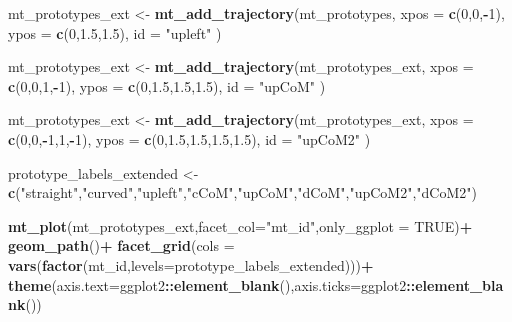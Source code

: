\documentclass[
]{article}
\newenvironment{Shaded}{\begin{snugshade}}{\end{snugshade}}
\newcommand{\AttributeTok}[1]{\textcolor[rgb]{0.13,0.29,0.53}{#1}}
\newcommand{\ConstantTok}[1]{\textcolor[rgb]{0.56,0.35,0.01}{#1}}
\newcommand{\DecValTok}[1]{\textcolor[rgb]{0.00,0.00,0.81}{#1}}
\newcommand{\FloatTok}[1]{\textcolor[rgb]{0.00,0.00,0.81}{#1}}
\newcommand{\FunctionTok}[1]{\textcolor[rgb]{0.13,0.29,0.53}{\textbf{#1}}}
\newcommand{\NormalTok}[1]{#1}
\newcommand{\OtherTok}[1]{\textcolor[rgb]{0.56,0.35,0.01}{#1}}
\newcommand{\SpecialCharTok}[1]{\textcolor[rgb]{0.81,0.36,0.00}{\textbf{#1}}}
\newcommand{\StringTok}[1]{\textcolor[rgb]{0.31,0.60,0.02}{#1}}
\begin{document}
\begin{Shaded}
\begin{Highlighting}[]
\NormalTok{mt\_prototypes\_ext }\OtherTok{\textless{}{-}} \FunctionTok{mt\_add\_trajectory}\NormalTok{(mt\_prototypes,}
   \AttributeTok{xpos =} \FunctionTok{c}\NormalTok{(}\DecValTok{0}\NormalTok{,}\DecValTok{0}\NormalTok{,}\SpecialCharTok{{-}}\DecValTok{1}\NormalTok{), }\AttributeTok{ypos =} \FunctionTok{c}\NormalTok{(}\DecValTok{0}\NormalTok{,}\FloatTok{1.5}\NormalTok{,}\FloatTok{1.5}\NormalTok{), }\AttributeTok{id =} \StringTok{"upleft"}
\NormalTok{)}

\NormalTok{mt\_prototypes\_ext }\OtherTok{\textless{}{-}} \FunctionTok{mt\_add\_trajectory}\NormalTok{(mt\_prototypes\_ext,}
   \AttributeTok{xpos =} \FunctionTok{c}\NormalTok{(}\DecValTok{0}\NormalTok{,}\DecValTok{0}\NormalTok{,}\DecValTok{1}\NormalTok{,}\SpecialCharTok{{-}}\DecValTok{1}\NormalTok{), }\AttributeTok{ypos =} \FunctionTok{c}\NormalTok{(}\DecValTok{0}\NormalTok{,}\FloatTok{1.5}\NormalTok{,}\FloatTok{1.5}\NormalTok{,}\FloatTok{1.5}\NormalTok{), }\AttributeTok{id =} \StringTok{"upCoM"}
\NormalTok{)}

\NormalTok{mt\_prototypes\_ext }\OtherTok{\textless{}{-}} \FunctionTok{mt\_add\_trajectory}\NormalTok{(mt\_prototypes\_ext,}
   \AttributeTok{xpos =} \FunctionTok{c}\NormalTok{(}\DecValTok{0}\NormalTok{,}\DecValTok{0}\NormalTok{,}\SpecialCharTok{{-}}\DecValTok{1}\NormalTok{,}\DecValTok{1}\NormalTok{,}\SpecialCharTok{{-}}\DecValTok{1}\NormalTok{), }\AttributeTok{ypos =} \FunctionTok{c}\NormalTok{(}\DecValTok{0}\NormalTok{,}\FloatTok{1.5}\NormalTok{,}\FloatTok{1.5}\NormalTok{,}\FloatTok{1.5}\NormalTok{,}\FloatTok{1.5}\NormalTok{), }\AttributeTok{id =} \StringTok{"upCoM2"}
\NormalTok{)}

\NormalTok{prototype\_labels\_extended }\OtherTok{\textless{}{-}} 
  \FunctionTok{c}\NormalTok{(}\StringTok{"straight"}\NormalTok{,}\StringTok{"curved"}\NormalTok{,}\StringTok{"upleft"}\NormalTok{,}\StringTok{"cCoM"}\NormalTok{,}\StringTok{"upCoM"}\NormalTok{,}\StringTok{"dCoM"}\NormalTok{,}\StringTok{"upCoM2"}\NormalTok{,}\StringTok{"dCoM2"}\NormalTok{)}

\FunctionTok{mt\_plot}\NormalTok{(mt\_prototypes\_ext,}\AttributeTok{facet\_col=}\StringTok{"mt\_id"}\NormalTok{,}\AttributeTok{only\_ggplot =} \ConstantTok{TRUE}\NormalTok{)}\SpecialCharTok{+}
  \FunctionTok{geom\_path}\NormalTok{()}\SpecialCharTok{+}
  \FunctionTok{facet\_grid}\NormalTok{(}\AttributeTok{cols =} \FunctionTok{vars}\NormalTok{(}\FunctionTok{factor}\NormalTok{(mt\_id,}\AttributeTok{levels=}\NormalTok{prototype\_labels\_extended)))}\SpecialCharTok{+}
  \FunctionTok{theme}\NormalTok{(}\AttributeTok{axis.text=}\NormalTok{ggplot2}\SpecialCharTok{::}\FunctionTok{element\_blank}\NormalTok{(),}\AttributeTok{axis.ticks=}\NormalTok{ggplot2}\SpecialCharTok{::}\FunctionTok{element\_blank}\NormalTok{()) }
\end{Highlighting}
\end{Shaded}
\end{document}
